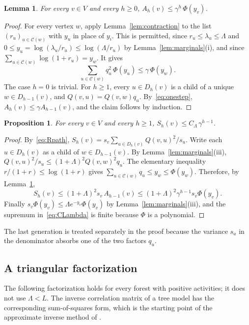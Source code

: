 \documentclass{amsart}
\numberwithin{equation}{section}
\numberwithin{table}{section}
\newtheorem{proposition}[theorem]{Proposition}
\newtheorem{lemma}[theorem]{Lemma}
\theoremstyle{definition}
\theoremstyle{remark}
\newcommand{\Ch}{\mathcal{C}}
\begin{document}
\begin{lemma}\label{lem:Adecay}
For every $v\in V$ and every $h\ge0$, $A_h(v)\le\gamma^h\,\Phi(y_v)$.
\end{lemma}

\begin{proof}
For every vertex $w$, apply Lemma~\ref{lem:contraction} to the list $(r_u)_{u\in\Ch(w)}$ with $y_u$ in place of $y_i$. This is permitted, since $r_u\le\lambda_u\le\Lambda$ and $0\le y_u=\log(\lambda_u/r_u)\le\log(\Lambda/r_u)$ by Lemma~\ref{lem:marginals}(i), and since $\sum_{u\in\Ch(w)}\log(1+r_u)=y_w$. It gives
\begin{equation}\label{eq:onestep}
\sum_{u\in\Ch(w)}q_u^2\,\Phi(y_u)\le\gamma\,\Phi(y_w).
\end{equation}
The case $h=0$ is trivial. For $h\ge1$, every $u\in D_h(v)$ is a child of a unique $w\in D_{h-1}(v)$, and $Q(v,u)=Q(v,w)q_u$. By~\eqref{eq:onestep}, $A_h(v)\le\gamma A_{h-1}(v)$, and the claim follows by induction.
\end{proof}

\begin{proposition}\label{prop:Sdecay}
For every $v\in V$ and every $h\ge1$, $S_h(v)\le C_\Lambda\,\gamma^{h-1}$.
\end{proposition}

\begin{proof}
By~\eqref{eq:Rpath}, $S_h(v)=s_v\sum_{u\in D_h(v)}Q(v,u)^2/s_u$. Write each $u\in D_h(v)$ as a child of $w\in D_{h-1}(v)$. By Lemma~\ref{lem:marginals}(iii), $Q(v,u)^2/s_u\le(1+\Lambda)^2Q(v,w)^2q_u$. The elementary inequality $r/(1+r)\le\log(1+r)$ gives $\sum_{u\in\Ch(w)}q_u\le y_w\le\Phi(y_w)$. Therefore, by Lemma~\ref{lem:Adecay},
\[
S_h(v)\le(1+\Lambda)^2s_v\,A_{h-1}(v)\le(1+\Lambda)^2\gamma^{h-1}s_v\Phi(y_v).
\]
Finally $s_v\Phi(y_v)\le\Lambda e^{-y_v}\Phi(y_v)$ by Lemma~\ref{lem:marginals}(iii), and the supremum in~\eqref{eq:CLambda} is finite because $\Phi$ is a polynomial.
\end{proof}

The last generation is treated separately in the proof because the variance $s_u$ in the denominator absorbs one of the two factors $q_u$.

\subsection{A triangular factorization}
The following factorization holds for every forest with positive activities; it does not use $\Lambda<L$. The inverse correlation matrix of a tree model has the corresponding sum-of-squares form, which is the starting point of the approximate inverse method of \cite[Proposition~29, Lemma~41]{CYYZ}.
\end{document}

